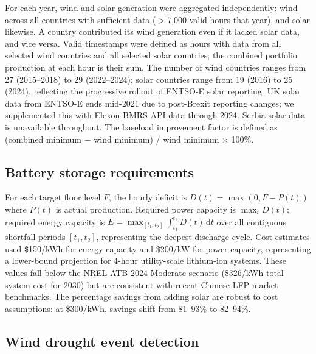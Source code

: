 \documentclass{article}
\begin{document}
For each year, wind and solar generation were aggregated independently: wind across all countries with sufficient data ($>$7,000 valid hours that year), and solar likewise. A country contributed its wind generation even if it lacked solar data, and vice versa. Valid timestamps were defined as hours with data from all selected wind countries and all selected solar countries; the combined portfolio production at each hour is their sum. The number of wind countries ranges from 27 (2015--2018) to 29 (2022--2024); solar countries range from 19 (2016) to 25 (2024), reflecting the progressive rollout of ENTSO-E solar reporting. UK solar data from ENTSO-E ends mid-2021 due to post-Brexit reporting changes; we supplemented this with Elexon BMRS API data through 2024. Serbia solar data is unavailable throughout. The baseload improvement factor is defined as (combined minimum $-$ wind minimum) / wind minimum $\times$ 100\%.

\subsection{Battery storage requirements}

For each target floor level $F$, the hourly deficit is $D(t) = \max(0, F - P(t))$ where $P(t)$ is actual production. Required power capacity is $\max_t D(t)$; required energy capacity is $E = \max_{[t_1,t_2]} \int_{t_1}^{t_2} D(t)\,\mathrm{d}t$ over all contiguous shortfall periods $[t_1, t_2]$, representing the deepest discharge cycle. Cost estimates used \$150/kWh for energy capacity and \$200/kW for power capacity, representing a lower-bound projection for 4-hour utility-scale lithium-ion systems. These values fall below the NREL ATB 2024 Moderate scenario (\$326/kWh total system cost for 2030) \citep{nrel2024} but are consistent with recent Chinese LFP market benchmarks. The percentage savings from adding solar are robust to cost assumptions: at \$300/kWh, savings shift from 81--93\% to 82--94\%.

\subsection{Wind drought event detection}
\label{sec:dunkelflaute_methods}
\end{document}

